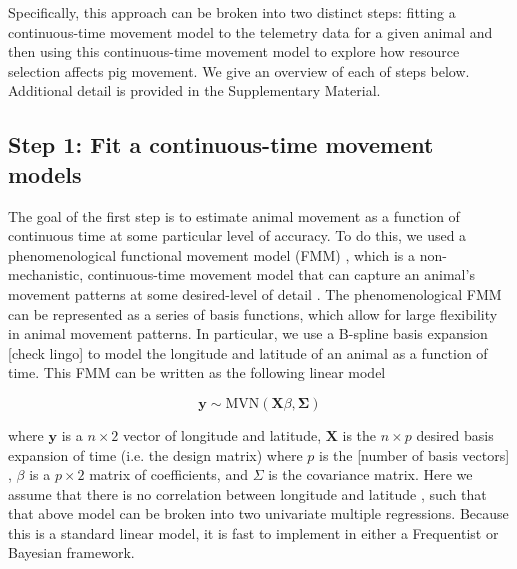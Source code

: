 \documentclass[a4paper]{article}
\begin{document}
Specifically, this approach can be broken into two distinct steps: fitting a continuous-time movement model to the telemetry data for a given animal and then using this continuous-time movement model to explore how resource selection affects pig movement. We give an overview of each of steps below. Additional detail is provided in the Supplementary Material.

\subsection*{Step 1: Fit a continuous-time movement models}


The goal of the first step is to estimate animal movement as a function of continuous time at some particular level of accuracy.  To do this, we used a phenomenological functional movement model (FMM) \citep{Buderman2016,Hooten2017a}, which is a non-mechanistic, continuous-time movement model that can capture an animal's movement patterns at some desired-level of detail \citep{Buderman2016}.  The phenomenological FMM can be represented as a series of basis functions, which allow for large flexibility in animal movement patterns.
In particular, we use a B-spline basis expansion [check lingo] to model the longitude and latitude of an animal as a function of time.  This FMM can be written as the following linear model  

\begin{equation}
	\mathbf{y} \sim \text{MVN}(\mathbf{X} \beta, \mathbf{\Sigma})
\end{equation}

where $\mathbf{y}$ is a $n \times 2$ vector of longitude and latitude, $\mathbf{X}$ is the $n \times p$ desired basis expansion of time (i.e. the design matrix) where $p$ is the [number of basis vectors] \citep{Hefley2017}, $\beta$ is a $p \times 2$ matrix of coefficients, and $\Sigma$ is the covariance matrix.  Here we assume that there is no correlation between longitude and latitude \cite[e.g.][]{Johnson2008a}, such that that above model can be broken into two univariate multiple regressions. Because this is a standard linear model, it is fast to implement in either a Frequentist or Bayesian framework. 
\end{document}
